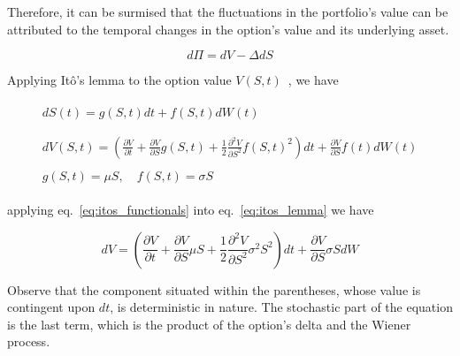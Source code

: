     Therefore, it can be surmised that the fluctuations in the portfolio's value can be attributed to the temporal
    changes in the option's value and its underlying asset.

    \begin{equation}
        d\Pi = dV - \Delta dS
        \label{eq:portfolio_fluctuation}
    \end{equation}

    Applying Itô's lemma to the option value $V(S,t)$~\cite{kuo_introduction_2006}, we have

    \begin{gather}
        \begin{split}
            dS(t)
                = g(S,t) dt + f(S,t) dW(t) \\
        \end{split}
        \label{eq:itos_process}
            \\
        \begin{split}
            dV(S, t)
                =
                    \left(
                        \frac{\partial V}{\partial t}
                        + \frac{\partial V}{\partial S} g(S,t)
                        + \frac{1}{2} \frac{\partial^2 V}{\partial S^2} f(S,t)^2
                    \right) dt
                    + \frac{\partial V}{\partial S} f(t) dW(t)
        \end{split}
        \label{eq:itos_lemma}
            \\
        \begin{split}
            g(S,t) = \mu S, \quad f(S,t) = \sigma S
        \end{split}
        \label{eq:itos_functionals}
    \end{gather}

    applying eq.~\ref{eq:itos_functionals} into eq.~\ref{eq:itos_lemma} we have

    \begin{equation}
        dV =
            \left(
                \frac{\partial V}{\partial t}
                    + \frac{\partial V}{\partial S} \mu S
                    + \frac{1}{2} \frac{\partial^2 V}{\partial S^2} \sigma^2 S^2
            \right) dt
            + \frac{\partial V}{\partial S} \sigma S dW
        \label{eq:itos_bs}
    \end{equation}

    Observe that the component situated within the parentheses, whose value is contingent upon $dt$,
    is deterministic in nature.
    The stochastic part of the equation is the last term,
    which is the product of the option's delta and the Wiener process.

